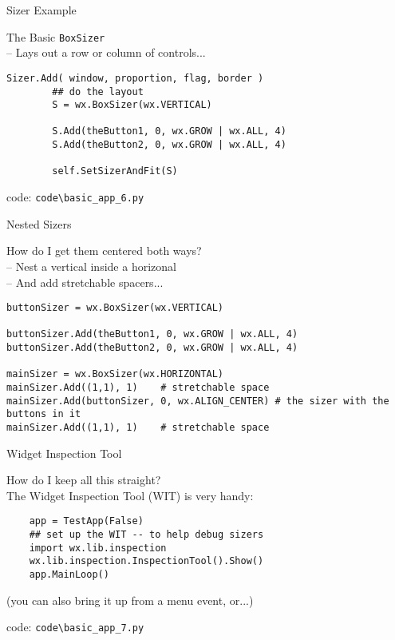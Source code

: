 \documentclass{beamer}
\begin{document}
\begin{frame}[fragile]{Sizer Example}

{\Large The Basic \verb`BoxSizer`}\\
{\large  -- Lays out a row or column of controls...}

\vfill
\begin{verbatim}
Sizer.Add( window, proportion, flag, border )
        ## do the layout
        S = wx.BoxSizer(wx.VERTICAL)
        
        S.Add(theButton1, 0, wx.GROW | wx.ALL, 4)
        S.Add(theButton2, 0, wx.GROW | wx.ALL, 4)
        
        self.SetSizerAndFit(S)
\end{verbatim}
\vfill
code: \verb`code\basic_app_6.py`
\end{frame}

\begin{frame}[fragile]{Nested Sizers}

{\Large How do I get them centered both ways?}\\
{\large  -- Nest a vertical inside a horizonal}\\
{\large  -- And add stretchable spacers...}

\vfill
\begin{verbatim}
buttonSizer = wx.BoxSizer(wx.VERTICAL)
        
buttonSizer.Add(theButton1, 0, wx.GROW | wx.ALL, 4)
buttonSizer.Add(theButton2, 0, wx.GROW | wx.ALL, 4)

mainSizer = wx.BoxSizer(wx.HORIZONTAL)
mainSizer.Add((1,1), 1)    # stretchable space
mainSizer.Add(buttonSizer, 0, wx.ALIGN_CENTER) # the sizer with the buttons in it
mainSizer.Add((1,1), 1)    # stretchable space
\end{verbatim}

\end{frame}

\begin{frame}[fragile]{Widget Inspection Tool}

{\Large How do I keep all this straight?}\\

\vfill
{\large  The Widget Inspection Tool (WIT) is very handy:}

\vfill
\begin{verbatim}
    app = TestApp(False)
    ## set up the WIT -- to help debug sizers
    import wx.lib.inspection
    wx.lib.inspection.InspectionTool().Show()
    app.MainLoop()
\end{verbatim}

(you can also bring it up from a menu event, or...)

\vfill
code: \verb`code\basic_app_7.py`

\end{frame}
\end{document}
